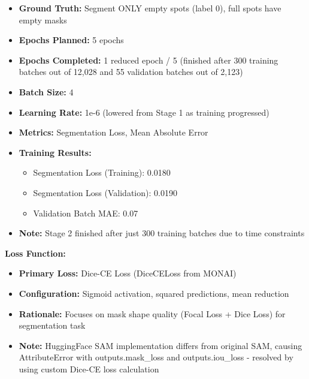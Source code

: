 \documentclass[12pt,a4paper]{article}
\begin{document}
\begin{enumerate}
\begin{itemize}
        \item \textbf{Ground Truth:} Segment ONLY empty spots (label 0), full spots have empty masks
        \item \textbf{Epochs Planned:} 5 epochs
        \item \textbf{Epochs Completed:} 1 reduced epoch / 5 (finished after 300 training batches out of 12,028 and 55 validation batches out of 2,123)
        \item \textbf{Batch Size:} 4
        \item \textbf{Learning Rate:} 1e-6 (lowered from Stage 1 as training progressed)
        \item \textbf{Metrics:} Segmentation Loss, Mean Absolute Error
        \item \textbf{Training Results:}
        \begin{itemize}
            \item Segmentation Loss (Training): 0.0180
            \item Segmentation Loss (Validation): 0.0190
            \item Validation Batch MAE: 0.07
        \end{itemize}
        \item \textbf{Note:} Stage 2 finished after just 300 training batches due to time constraints
    \end{itemize}
\end{enumerate}

\textbf{Loss Function:}
\begin{itemize}
    \item \textbf{Primary Loss:} Dice-CE Loss (DiceCELoss from MONAI)
    \item \textbf{Configuration:} Sigmoid activation, squared predictions, mean reduction
    \item \textbf{Rationale:} Focuses on mask shape quality (Focal Loss + Dice Loss) for segmentation task
    \item \textbf{Note:} HuggingFace SAM implementation differs from original SAM, causing AttributeError with outputs.mask\_loss and outputs.iou\_loss - resolved by using custom Dice-CE loss calculation
\end{itemize}
\end{document}
